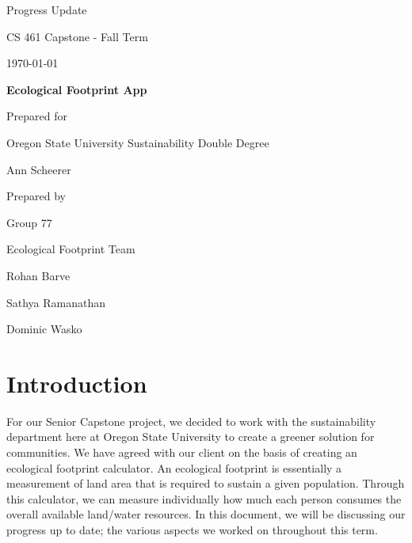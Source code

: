 \documentclass[onecolumn, draftclsnofoot,10pt, compsoc, tikz]{IEEEtran}
\def \CapstoneTeamName{		Ecological Footprint Team}
\def \CapstoneTeamNumber{		77}
\def \GroupMemberOne{			Rohan Barve}
\def \GroupMemberTwo{			Sathya Ramanathan}
\def \GroupMemberThree{			Dominic Wasko}
\def \CapstoneProjectName{		Ecological Footprint App}
\def \CapstoneSponsorCompany{	Oregon State University Sustainability Double Degree}
\def \CapstoneSponsorPerson{		Ann Scheerer}
\def \DocType{Progress Update}
\newcommand{\NameSigPair}[1]{\par
\makebox[2.75in][r]{#1} \hfil 	\makebox[3.25in]{\makebox[2.25in]{\hrulefill} \hfill		\makebox[.75in]{\hrulefill}}
\par\vspace{-12pt} \textit{\tiny\noindent
\makebox[2.75in]{} \hfil		\makebox[3.25in]{\makebox[2.25in][r]{Signature} \hfill	\makebox[.75in][r]{Date}}}}
\renewcommand{\NameSigPair}[1]{#1}
\begin{document}
\begin{titlepage}
    \begin{singlespace}
        \hfill 
        \par\vspace{.2in}
        \centering
        \scshape{
	 \huge \DocType \par
            \huge CS 461 Capstone - Fall Term \par
            {\large\today}\par
            \vspace{.5in}
            \textbf{\Huge\CapstoneProjectName}\par
            \vfill
            {\large Prepared for}\par
            \Huge \CapstoneSponsorCompany\par
            \vspace{5pt}
            {\Large\NameSigPair{\CapstoneSponsorPerson}\par}
            {\large Prepared by }\par
            Group\CapstoneTeamNumber\par
            \CapstoneTeamName\par 
            \vspace{5pt}
            {\Large
                \NameSigPair{\GroupMemberOne}\par
                \NameSigPair{\GroupMemberTwo}\par
                \NameSigPair{\GroupMemberThree}\par
            }
            \vspace{20pt}
        }
        
        \begin{abstract}

        \end{abstract}  
        
        
    \end{singlespace}
\end{titlepage}
\newpage
{}
\tableofcontents
\clearpage


\section{Introduction}
For our Senior Capstone project, we decided to work with the sustainability department here at Oregon State University to create a greener solution for communities. We have agreed with our client on the basis of creating an ecological footprint calculator. An ecological footprint is essentially a measurement of land area that is required to sustain a given population. Through this calculator, we can measure individually how much each person consumes the overall available land/water resources. In this document, we will be discussing our progress up to date; the various aspects we worked on throughout this term.
\end{document}
